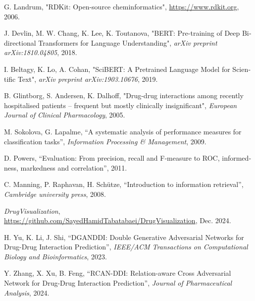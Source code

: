 \begin{thebibliography}{99}
\begin{latin}
G. Landrum, "RDKit: Open-source cheminformatics", \url{https://www.rdkit.org}, 2006.

J. Devlin, M. W. Chang, K. Lee, K. Toutanova, "BERT: Pre-training of Deep Bidirectional Transformers for Language Understanding", \textit{arXiv preprint arXiv:1810.04805}, 2018.

I. Beltagy, K. Lo, A. Cohan, "SciBERT: A Pretrained Language Model for Scientific Text", \textit{arXiv preprint arXiv:1903.10676}, 2019.

B. Glintborg, S. Andersen, K. Dalhoff, "Drug-drug interactions among recently hospitalised patients – frequent but mostly clinically insignificant", \textit{European Journal of Clinical Pharmacology}, 2005.

M. Sokolova, G. Lapalme, “A systematic analysis of performance measures for classification tasks”, \textit{Information Processing \& Management}, 2009.

D. Powers, “Evaluation: From precision, recall and F-measure to ROC, informedness, markedness and correlation”, 2011.

C. Manning, P. Raphavan, H. Schütze, “Introduction to information retrieval”, \textit{Cambridge university press}, 2008.

\textit{DrugVisualization}, \url{https://github.com/SayedHamidTabatabaei/DrugVisualization}, Dec. 2024.

H. Yu, K. Li, J. Shi, “DGANDDI: Double Generative Adversarial Networks for Drug-Drug Interaction Prediction”, \textit{IEEE/ACM Transactions on Computational Biology and Bioinformatics}, 2023.

Y. Zhang, X. Xu, B. Feng, “RCAN-DDI: Relation-aware Cross Adversarial Network for Drug-Drug Interaction Prediction”, \textit{Journal of Pharmaceutical Analysis}, 2024.






\end{latin}
\end{thebibliography}
